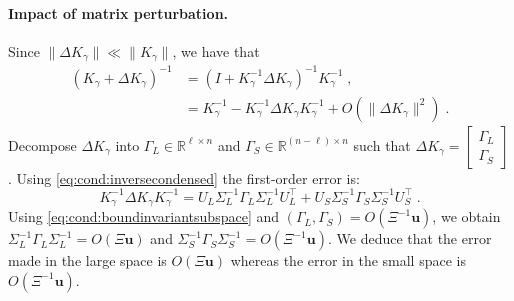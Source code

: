 \documentclass[smallextended]{svjour3}
\newcommand{\epstol}{\mathbf{u}}
\begin{document}
\paragraph{Impact of matrix perturbation.}
Since $\|\Delta K_\gamma\| \ll \|K_\gamma\|$, we have that
\begin{equation}
  \label{eq:cond:invperturbed}
  \begin{aligned}
    (K_\gamma + \Delta K_\gamma)^{-1} &= (I + K_\gamma^{-1} \Delta K_\gamma)^{-1} K_\gamma^{-1} \; , \\
                                      &= K_\gamma^{-1} - K_\gamma^{-1}\Delta K_\gamma K_\gamma^{-1} + O(\|\Delta K_\gamma\|^2) \; .
  \end{aligned}
\end{equation}
Decompose $\Delta K_\gamma$ into
$\Gamma_L \in \mathbb{R}^{\ell \times n}$ and $\Gamma_S \in \mathbb{R}^{(n-\ell) \times n}$ such that
$\Delta K_\gamma = \begin{bmatrix}
  \Gamma_L \\ \Gamma _S
\end{bmatrix}$.
Using \eqref{eq:cond:inversecondensed} the first-order error is:
\begin{equation}
  \label{eq:cond:inversecondensederror}
  K_\gamma^{-1}\Delta K_\gamma K_\gamma^{-1}  =
U_L \Sigma_L^{-1} \Gamma_L \Sigma_L^{-1}U_L^\top  +
  U_S \Sigma_S^{-1} \Gamma_S \Sigma_S^{-1}U_S^\top  \;.
\end{equation}
Using \eqref{eq:cond:boundinvariantsubspace} and $(\Gamma_L, \Gamma_S)= O( \Xi^{-1}\epstol)$,
we obtain $\Sigma_L^{-1} \Gamma_L \Sigma_L^{-1} = O(\Xi \epstol)$
and $\Sigma_S^{-1} \Gamma_S \Sigma_S^{-1} = O(\Xi^{-1} \epstol)$.
We deduce that the error made in the large space is $O(\Xi\epstol)$ whereas
the error in the small space is $O(\Xi^{-1}\epstol )$.
\end{document}
